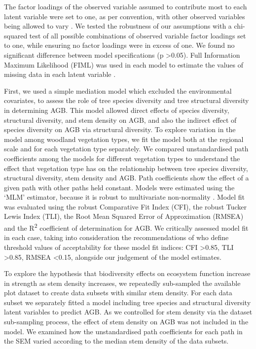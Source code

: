 \documentclass[12pt,a4paper]{article}
\begin{document}
The factor loadings of the observed variable assumed to contribute most to each latent variable were set to one, as per convention, with other observed variables being allowed to vary \citep{Beaujean2014}. We tested the robustness of our assumptions with a chi-squared test of all possible combinations of observed variable factor loadings set to one, while ensuring no factor loadings were in excess of one. We found no significant difference between model specifications (p >0.05). Full Information Maximum Likelihood (FIML) was used in each model to estimate the values of missing data in each latent variable \citep{Cham2017}.

First, we used a simple mediation model which excluded the environmental covariates, to assess the role of tree species diversity and tree structural diversity in determining AGB. This model allowed direct effects of species diversity, structural diversity, and stem density on AGB, and also the indirect effect of species diversity on AGB via structural diversity. To explore variation in the model among woodland vegetation types, we fit the model both at the regional scale and for each vegetation type separately. We compared unstandardised path coefficients among the models for different vegetation types to understand the effect that vegetation type has on the relationship between tree species diversity, structural diversity, stem density and AGB. Path coefficients show the effect of a given path with other paths held constant. Models were estimated using the `MLM' estimator, because it is robust to multivariate non-normality \citep{Shapiro1983}. Model fit was evaluated using the robust Comparative Fit Index (CFI), the robust Tucker Lewis Index (TLI), the Root Mean Squared Error of Approximation (RMSEA) and the R\textsuperscript{2} coefficient of determination for AGB. We critically assessed model fit in each case, taking into consideration the recommendations of \citet{Hu1999} who define threshold values of acceptability for these model fit indices: CFI >0.85, TLI >0.85, RMSEA <0.15, alongside our judgement of the model estimates.

To explore the hypothesis that biodiversity effects on ecosystem function increase in strength as stem density increases, we repeatedly sub-sampled the available plot dataset to create \subn{} data subsets with similar stem density. For each data subset we separately fitted a model including tree species and structural diversity latent variables to predict AGB. As we controlled for stem density via the dataset sub-sampling process, the effect of stem density on AGB was not included in the model. We examined how the unstandardised path coefficients for each path in the SEM varied according to the median stem density of the data subsets. 
\end{document}

